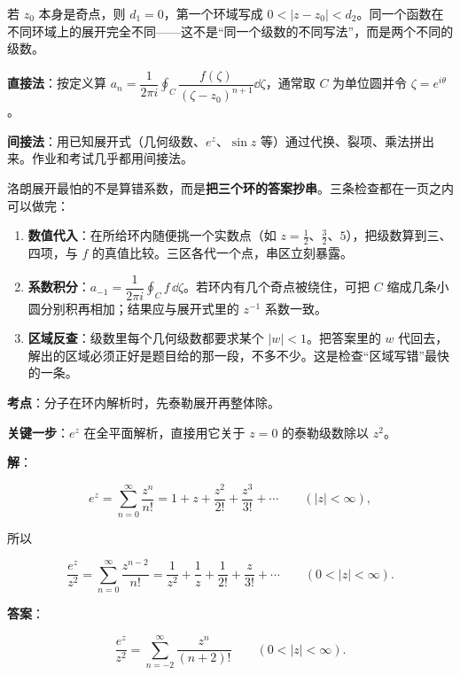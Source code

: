 \documentclass[11pt]{ctexart}
\renewcommand{\qbreak}{\needspace{0.45\textheight}}
\let\origsubhdr\subhdr
\renewcommand{\subhdr}[1]{\par\needspace{4\baselineskip}\origsubhdr{#1}}
\begin{document}
若 $z_0$ 本身是奇点，则 $d_1=0$，第一个环域写成 $0<|z-z_0|<d_2$。同一个函数在不同环域上的展开完全不同——这不是“同一个级数的不同写法”，而是两个不同的级数。


\textbf{直接法}：按定义算 $a_n=\dfrac{1}{2\pi i}\oint_C\dfrac{f(\zeta)}{(\zeta-z_0)^{n+1}}\dd\zeta$，通常取 $C$ 为单位圆并令 $\zeta=e^{i\theta}$。

\textbf{间接法}：用已知展开式（几何级数、$e^z$、$\sin z$ 等）通过代换、裂项、乘法拼出来。作业和考试几乎都用间接法。


洛朗展开最怕的不是算错系数，而是\textbf{把三个环的答案抄串}。三条检查都在一页之内可以做完：

\begin{enumerate}
\item \textbf{数值代入}：在所给环内随便挑一个实数点（如 $z=\tfrac12$、$\tfrac32$、$5$），把级数算到三、四项，与 $f$ 的真值比较。三区各代一个点，串区立刻暴露。
\item \textbf{系数积分}：$a_{-1}=\dfrac{1}{2\pi i}\oint_Cf\,\dd\zeta$。若环内有几个奇点被绕住，可把 $C$ 缩成几条小圆分别积再相加；结果应与展开式里的 $z^{-1}$ 系数一致。
\item \textbf{区域反查}：级数里每个几何级数都要求某个 $|w|<1$。把答案里的 $w$ 代回去，解出的区域必须正好是题目给的那一段，不多不少。这是检查“区域写错”最快的一条。
\end{enumerate}

\qbreak
{}

\textbf{考点}：分子在环内解析时，先泰勒展开再整体除。

\textbf{关键一步}：$e^z$ 在全平面解析，直接用它关于 $z=0$ 的泰勒级数除以 $z^2$。

\textbf{解}：

\[ e^z=\sum_{n=0}^{\infty}\frac{z^n}{n!}=1+z+\frac{z^2}{2!}+\frac{z^3}{3!}+\cdots\qquad(|z|<\infty) , \]

所以

\[ \frac{e^z}{z^2}=\sum_{n=0}^{\infty}\frac{z^{n-2}}{n!}=\frac{1}{z^2}+\frac{1}{z}+\frac{1}{2!}+\frac{z}{3!}+\cdots\qquad(0<|z|<\infty) . \]

\textbf{答案}：

\[ \frac{e^z}{z^2}=\sum_{n=-2}^{\infty}\frac{z^n}{(n+2)!}\qquad(0<|z|<\infty) . \]
\end{document}
